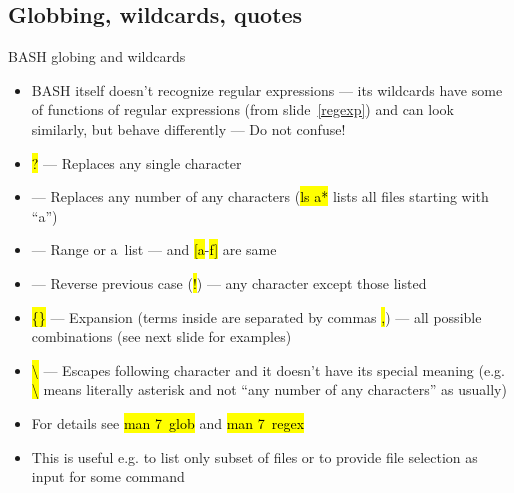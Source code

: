 \documentclass[compress, ucs, xelatex, 11pt, xcolor=svgnames, aspectratio=169,
	hyperref={
		bookmarks=true,
		unicode=true,
		colorlinks=true,
		pdftitle={Linux, command line and MetaCentrum},
		plainpages=false,
		pdfauthor={Vojtech Zeisek},
		pdfsubject={Course about use of Linux command line, writing shell scripts and using MetaCentrum of CESNET},
		pdfcreator={XeLaTeX},
		pdfkeywords={Linux, GNU, BASH, shell, command line, MetaCentrum},
		linkcolor=DarkRed, %
		anchorcolor=DarkBlue, %
		citecolor=Indigo, %
		filecolor=NavyBlue, %
		menucolor=DarkMagenta, %
		urlcolor=DarkBlue, %
		pdftex},
	url={hyphens, lowtilde} %
	]{beamer}
\renewcommand{\texttt}[1]{\hl{\ttfamily #1}}
\begin{document}
\subsection{Globbing, wildcards, quotes}

\begin{frame}{BASH globing and wildcards}
	\label{globbing}
	\begin{itemize}
		\item BASH itself doesn't recognize regular expressions --- its wildcards have some of functions of regular expressions (from slide~\ref{regexp}) and can look similarly, but behave differently --- Do not confuse!
		\item \texttt{?} --- Replaces any single character
		\item \texttt{*} --- Replaces any number of any characters (\texttt{ls a*} lists all files starting with \enquote{a})
		\item \texttt{[]} --- Range or a~list --- \texttt{[abcdef]} and \texttt{[a}-\texttt{f]} are same
		\item \texttt{[!\ldots]} --- Reverse previous case (\texttt{!}) --- any character except those listed
		\item \texttt{\{\}} --- Expansion (terms inside are separated by commas \texttt{,}) --- all possible combinations (see next slide for examples)
		\item \texttt{\textbackslash} --- Escapes following character and it doesn't have its special meaning (e.g. \texttt{\textbackslash *} means literally asterisk \texttt{*} and not \enquote{any number of any characters} as usually)
		\item For details see \texttt{man 7~glob} and \texttt{man 7~regex}
		\item This is useful e.g. to list only subset of files or to provide file selection as input for some command
	\end{itemize}
\end{frame}
\end{document}

